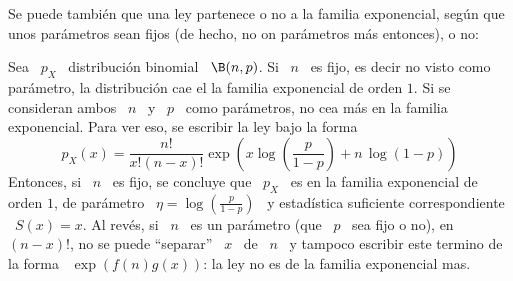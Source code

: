 Se puede tambi\'en que una ley  partenece o no a la familia exponencial, seg\'un
que unos par\'ametros sean fijos  (de hecho, no on par\'ametros m\'as entonces),
o no:
%
\begin{ejemplo}
  Sea \  $p_X$ \ distribuci\'on  binomial \  $\B(n,p)$. Si \  $n$ \ es  fijo, es
  decir  no  visto  como  par\'ametro,  la  distribuci\'on  cae  el  la  familia
  exponencial  de orden $1$.  Si se  consideran ambos  \ $n$  \ y  \ $p$  \ como
  par\'ametros,  no  cea m\'as  en  la familia  exponencial.  Para  ver eso,  se
  escribir la ley bajo la forma
  \[
  p_X(x) = \frac{n!}{x! (n-x)!}  \exp\left( x \log\left( \frac{p}{1-p}
    \right) + n \, \log(1-p) \right)
  \]
  Entonces, si  \ $n$  \ es fijo,  se concluye que  \ $p_X$  \ es en  la familia
  exponencial de  orden $1$, de  par\'ametro \ $\eta =  \log\left( \frac{p}{1-p}
  \right)$  \  y estad\'istica  suficiente  correspondiente  \  $S(x) =  x$.  Al
  rev\'es,  si \  $n$ \  es un  par\'ametro  (que \  $p$ \  sea fijo  o no),  en
  $(n-x)!$, no se puede  ``separar'' \ $x$ \ de \ $n$  \ y tampoco escribir este
  termino  de la  forma \  $\exp(  f(n) g(x)  )$: la  ley  no es  de la  familia
  exponencial mas.
\end{ejemplo}

